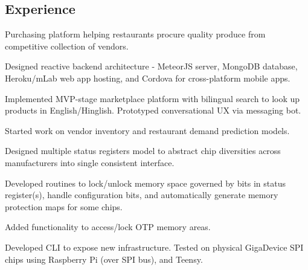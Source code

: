 \documentclass[]{deedy}
\begin{document}
\begin{minipage}[t]{0.69\textwidth}
\begin{flushleft}
\section{Experience}
%
\vspace{1.1pt}
\begin{tightemize}
\item Purchasing platform helping restaurants procure quality produce from competitive collection of vendors.
\item Designed reactive backend architecture - MeteorJS server, MongoDB database, Heroku/mLab web app hosting, and Cordova for cross-platform mobile apps.
\item Implemented MVP-stage marketplace platform with bilingual search to look up products in English/Hinglish. Prototyped conversational UX via messaging bot.
\item Started work on vendor inventory and restaurant demand prediction models.
\end{tightemize}
\sectionsep
%
\vspace{1.1pt}
\begin{tightemize}
\item Designed multiple status registers model to abstract chip diversities across manufacturers into single consistent interface.
\item Developed routines to lock/unlock memory space governed by bits in status register(s), handle configuration bits, and automatically generate memory protection maps for some chips.
\item Added functionality to access/lock OTP memory areas.
\item Developed CLI to expose new infrastructure. Tested on physical GigaDevice SPI chips using Raspberry Pi (over SPI bus), and Teensy.

\end{tightemize}
\end{flushleft}
\end{minipage}
\end{document}
